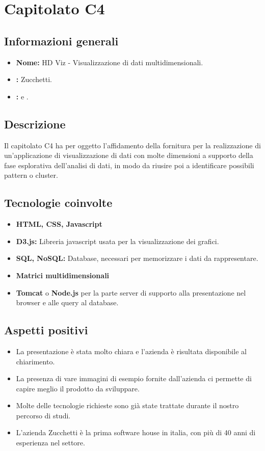 \section{Capitolato C4}

\subsection{Informazioni generali}
\begin{itemize}
\item \textbf{Nome:} HD Viz - Visualizzazione di dati multidimensionali.
\item \textbf{\commitProg:} Zucchetti.
\item \textbf{\proponProg:} \VT{} e \CR.
\end{itemize}

\subsection{Descrizione}
Il capitolato C4 ha per oggetto l’affidamento della fornitura per la realizzazione di un'applicazione di visualizzazione di dati con molte dimensioni a supporto della fase esplorativa dell'analisi di dati, in modo da riusire poi a identificare possibili pattern o cluster.

\subsection{Tecnologie coinvolte}
\begin{itemize}
\item \textbf{HTML, CSS, Javascript} 
\item \textbf{D3.js:} Libreria javascript usata per la visualizzazione dei grafici.
\item \textbf{SQL, NoSQL:} Database, necessari per memorizzare i dati da rappresentare.
\item \textbf{Matrici multidimensionali}
\item \textbf{Tomcat} o \textbf{Node.js} per la parte server di supporto alla presentazione nel browser e alle query al database.
\end{itemize}

\subsection{Aspetti positivi}
\begin{itemize}
\item La presentazione è stata molto chiara e l’azienda è risultata disponibile al chiarimento.
\item La presenza di vare immagini di esempio fornite dall'azienda ci permette di capire meglio il prodotto da sviluppare.
\item Molte delle tecnologie richieste sono già state trattate durante il nostro percorso di studi.
\item L’azienda Zucchetti è la prima software house in italia, con più di 40 anni di esperienza nel settore.
\end{itemize}

